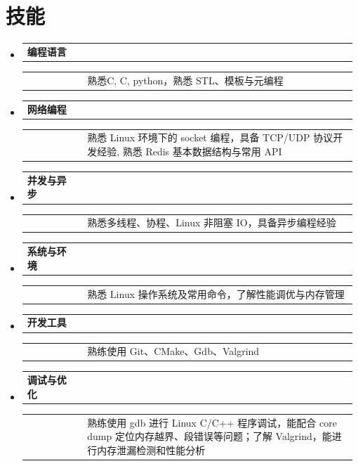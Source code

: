 \documentclass[a4paper]{article}
\newcommand{\resumeSectionType}[3]{
  \item\begin{tabular*}{0.96\textwidth}[t]{
    p{0.15\linewidth}p{0.02\linewidth}p{0.81\linewidth}
  }
    \textbf{#1} & #2 & #3
  \end{tabular*}\vspace{-2pt}
}
\newcommand{\resumeHeadingListStart}{
  \begin{itemize}[leftmargin=0.15in, label={}]
}
\newcommand{\resumeHeadingListEnd}{\end{itemize}}
\newcommand{\Rplus}{\protect\hspace{-.1em}\protect\raisebox{.35ex}{\smaller{\smaller\textbf{+}}}}
\newcommand{\Cpp}{\mbox{C\Rplus\Rplus}\xspace}
\begin{document}
\newcommand{\resumeSectionTypeMultiline}[3]{
  \item
  \begin{tabular*}{0.96\textwidth}[t]{p{0.15\linewidth}p{0.02\linewidth}p{0.81\linewidth}}
    \textbf{#1} & #2 & \\
  \end{tabular*}
  \begin{tabular*}{0.96\textwidth}[t]{p{0.15\linewidth}p{0.02\linewidth}p{0.81\linewidth}}
    & & #3 \\
  \end{tabular*}\vspace{-2pt}
}



\section{\LARGE 技能}
  \resumeHeadingListStart{}



    \resumeSectionTypeMultiline{编程语言}{}{熟悉C, \Cpp, python，熟悉 STL、模板与元编程}
    \resumeSectionTypeMultiline{网络编程}{}{熟悉 Linux 环境下的 socket 编程，具备 TCP/UDP 协议开发经验, 熟悉 Redis 基本数据结构与常用 API}
    \resumeSectionTypeMultiline{并发与异步}{}{熟悉多线程、协程、Linux 非阻塞 IO，具备异步编程经验}

    \resumeSectionTypeMultiline{系统与环境}{}{熟悉 Linux 操作系统及常用命令，了解性能调优与内存管理}
    \resumeSectionTypeMultiline{开发工具}{}{熟练使用 Git、CMake、Gdb、Valgrind}
    \resumeSectionTypeMultiline{调试与优化}{}{熟练使用 gdb 进行 Linux C/C++ 程序调试，能配合 core dump 定位内存越界、段错误等问题；了解 Valgrind，能进行内存泄漏检测和性能分析}

  \resumeHeadingListEnd{}




\end{document}
